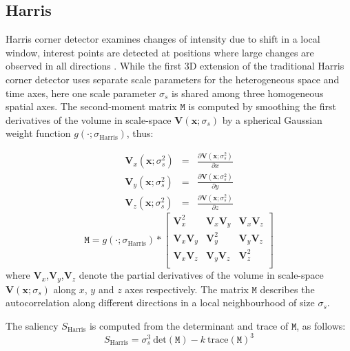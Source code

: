 \subsection{Harris}
Harris corner detector examines changes of intensity due to shift in a local window, interest points are detected at positions where large changes are observed in all directions \cite{Harris1988}. While the first 3D extension \cite{Laptev2005} of the traditional Harris corner detector uses separate scale parameters for the heterogeneous space and time axes, here one scale parameter $\sigma_s$ is shared among three homogeneous spatial axes. 
The second-moment matrix $\mathtt{M}$ is computed by smoothing the first derivatives of the volume in scale-space $\mathbf{V}(\mathbf{x};\sigma_s)$ by a spherical Gaussian weight function $g(\cdot;\sigma_\textrm{Harris})$, thus: 

\begin{equation}
\begin{array}{rcl}
\mathbf{V}_x(\mathbf{x};\sigma^2_s) &= &\displaystyle\frac{\partial \mathbf{V}(\mathbf{x};\sigma^2_s)}{\partial x} \\
\mathbf{V}_y(\mathbf{x};\sigma^2_s) &= &\displaystyle\frac{\partial \mathbf{V}(\mathbf{x};\sigma^2_s)}{\partial y} \\
\mathbf{V}_z(\mathbf{x};\sigma^2_s) &= &\displaystyle\frac{\partial \mathbf{V}(\mathbf{x};\sigma^2_s)}{\partial z}
\end{array}
\end{equation}
\begin{equation}
\mathtt{M} = g(\cdot;\sigma_\textrm{Harris}) \ast \left[
\begin{array}{ccc}
\mathbf{V}^2_x & \mathbf{V}_x\mathbf{V}_y & \mathbf{V}_x\mathbf{V}_z \\
\mathbf{V}_x\mathbf{V}_y & \mathbf{V}_y^2 & \mathbf{V}_y\mathbf{V}_z \\
\mathbf{V}_x\mathbf{V}_z & \mathbf{V}_y\mathbf{V}_z & \mathbf{V}^2_z \\
\end{array}
\right]
\label{eqn/eval/harris_2ndmoment}
\end{equation}
where $\mathbf{V}_x$,$\mathbf{V}_y$,$\mathbf{V}_z$ denote the partial derivatives of the volume in scale-space $\mathbf{V}(\mathbf{x};\sigma_s)$ along $x$, $y$ and $z$ axes respectively. 
The matrix $\mathtt{M}$ describes the autocorrelation along different directions in a local neighbourhood of size $\sigma_s$. 

The saliency $S_\textrm{Harris}$ is computed from the determinant and trace of $\mathtt{M}$, as follows:
\begin{equation}
S_\textrm{Harris} = \sigma_{s}^3 \:\mathrm{det}(\mathtt{M}) - k\:\mathrm{trace(\mathtt{M})}^3
\label{eq/eval/harriscorner}
\end{equation}

